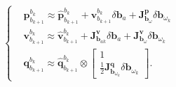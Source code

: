 \documentclass[12pt]{article}   %
\begin{document}
\begin{equation}
	\left\{
	\begin{aligned}
	&\bm{p}_{b_{k+1}}^{b_k}\approx\hat{\bm{p}}_{b_{k+1}}^{b_k}+\bm{v}_{b_{k+1}}^{b_k}\delta\bm{b}_a+\bm{J}^{\bm{p}}_{\bm{b}_\omega}\delta\bm{b}_{\omega_k} \\
	&\bm{v}_{b_{k+1}}^{b_k}\approx\hat{\bm{v}}_{b_{k+1}}^{b_k}+\bm{J}^{\bm{v}}_{\bm{b}_{ak}}\delta\bm{b}_a+\bm{J}^{\bm{v}}_{\bm{b}_\omega}\delta\bm{b}_{\omega_k} \\
	&\bm{q}_{b_{k+1}}^{b_k}\approx\hat{\bm{q}}_{b_{k+1}}^{b_k}\otimes 
		\begin{bmatrix}
			1 \\ \frac{1}{2}\bm{J}^{\bm{q}}_{\bm{b}_{\omega_k}}\delta\bm{b}_{\omega_k}
		\end{bmatrix}.
	\end{aligned}
	\right.
	\label{eq.discrete}
	\end{equation}
\end{document}
